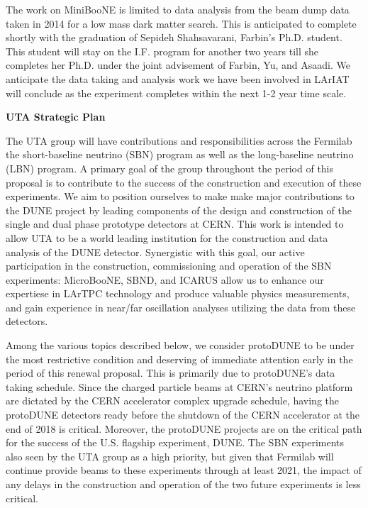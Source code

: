 The work on MiniBooNE is limited to data analysis from the beam dump data taken in 2014 for a low mass dark matter search. This is anticipated to complete shortly with the graduation of Sepideh Shahsavarani, Farbin’s Ph.D. student. This student will stay on the I.F. program for another two years till she completes her Ph.D. under the joint advisement of Farbin, Yu, and Asaadi. We anticipate the data taking and analysis work we have been involved in LArIAT will conclude as the experiment completes within the next 1-2 year time scale. 

\begin{center}
\textbf{ \Large{UTA Strategic Plan} }
\end{center} 

The UTA group will have contributions and responsibilities across the Fermilab the short-baseline neutrino (SBN) program as well as the long-baseline neutrino (LBN) program. A primary goal of the group throughout the period of this proposal is to contribute to the success of the construction and execution of these experiments. We aim to position ourselves to make make major contributions to the DUNE project by leading components of the design and construction of the single and dual phase prototype detectors at CERN. This work is intended to allow UTA to be a world leading institution for the construction and data analysis of the DUNE detector. Synergistic with this goal, our active participation in the construction, commissioning and operation of the SBN experiments: MicroBooNE, SBND, and ICARUS allow us to enhance our expertiese in LArTPC technology and produce valuable physics measurements, and gain experience in near/far oscillation analyses utilizing the data from these detectors.

Among the various topics described below, we consider protoDUNE to be under the most restrictive condition and deserving of immediate  attention early in the period of this renewal proposal.  This is primarily due to protoDUNE's data taking schedule. Since the charged particle beams at CERN's neutrino platform are dictated by the CERN accelerator complex upgrade schedule, having the protoDUNE detectors ready before the shutdown of the CERN accelerator at the end of 2018 is critical. Moreover, the protoDUNE projects are on the critical path for the success of the U.S. flagship experiment, DUNE. The SBN experiments also seen by the UTA group as a high priority, but given that Fermilab will continue provide beams to these experiments through at least 2021, the impact of any delays in the construction and operation of the two future experiments is less critical.

